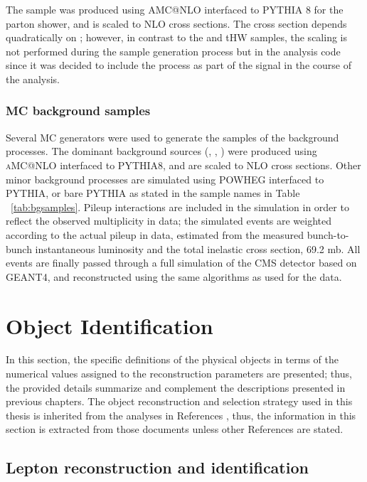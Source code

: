The \ttH sample was produced using \textsc{AMC@NLO} interfaced to \textsc{PYTHIA} 8 for the parton shower, and is scaled to NLO cross sections. The \ttH cross section depends quadratically on \Ct; however, in contrast to the \tHq and tHW samples, the scaling is not performed during the sample generation process but in the analysis code since it was decided to include the \ttH process as part of the signal in the course of the analysis.     


\subsubsection*{MC background samples}

Several MC generators were used to generate the samples of the background processes. The dominant background sources (\ttbar, \ttW, \ttZ) were produced using \textsc{aMC@NLO} interfaced to PYTHIA8, and are scaled to NLO cross sections. Other minor background processes are simulated using POWHEG interfaced to PYTHIA, or bare PYTHIA as stated in the sample names in Table ~\ref{tab:bgsamples}. Pileup interactions are included in the simulation in order to reflect the observed multiplicity in data; the simulated events are weighted according to the actual pileup in data, estimated from the measured bunch-to-bunch instantaneous luminosity and the total inelastic cross section, 69.2 mb. All events are finally passed through a full simulation of the CMS detector based on GEANT4, and reconstructed using the same algorithms as used for the data.
\section{Object Identification}\label{sec:ob_id}


In this section, the specific definitions of the physical objects in terms of the numerical values assigned to the reconstruction parameters are presented; thus, the provided details summarize and complement the descriptions presented in previous chapters. The object reconstruction and selection strategy used in this thesis is inherited from the analyses in References \cite{CMS_AN_2016-211,CMS_AN_2017-029}, thus, the information in this section is extracted from those documents unless other References are stated.

\subsection{Lepton reconstruction and identification}

